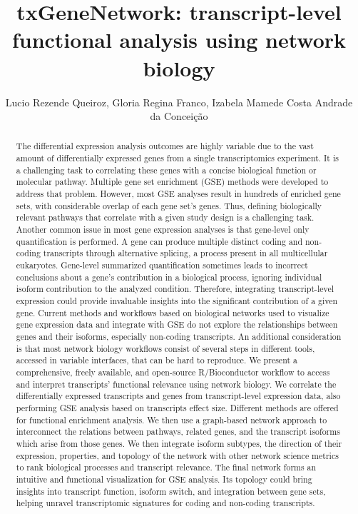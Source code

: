 \documentclass[twoside]{article}
\title{\vspace{-15mm}\fontsize{24pt}{10pt}\selectfont\textbf{ txGeneNetwork: transcript-level functional analysis using network biology }} %
\author{ Lucio Rezende Queiroz,  Gloria Regina Franco,  Izabela Mamede Costa Andrade da Concei\c{c}\~ao }
\affil{ UFMG - Departamento de Bioqu\'{\i}mica e Imunologia,  UFMG,  UNIVERSIDADE FEDERAL DE MINAS GERAIS }
\date{}
\begin{document}
  
  
  \maketitle %
  
  
  \thispagestyle{fancy} %
  
  
  \begin{abstract}
  The differential expression analysis outcomes are highly variable due to the vast amount of differentially expressed genes from a single transcriptomics experiment. It is a challenging task to correlating these genes with a concise biological function or molecular pathway. Multiple gene set enrichment (GSE) methods were developed to address that problem. However,  most GSE analyses result in hundreds of enriched gene sets,  with considerable overlap of each gene set’s genes. Thus,  defining biologically relevant pathways that correlate with a given study design is a challenging task.
Another common issue in most gene expression analyses is that gene-level only quantification is performed. A gene can produce multiple distinct coding and non-coding transcripts through alternative splicing,  a process present in all multicellular eukaryotes. Gene-level summarized quantification sometimes leads to incorrect conclusions about a gene’s contribution in a biological process,  ignoring individual isoform contribution to the analyzed condition. Therefore,  integrating transcript-level expression could provide invaluable insights into the significant contribution of a given gene.
Current methods and workflows based on biological networks used to visualize gene expression data and integrate with GSE do not explore the relationships between genes and their isoforms,  especially non-coding transcripts. An additional consideration is that most network biology workflows consist of several steps in different tools,  accessed in variable interfaces,  that can be hard to reproduce. We present a comprehensive,  freely available,  and open-source R/Bioconductor workflow to access and interpret transcripts’ functional relevance using network biology.
We correlate the differentially expressed transcripts and genes from transcript-level expression data,  also performing GSE analysis based on transcripts effect size. Different methods are offered for functional enrichment analysis. We then use a graph-based network approach to interconnect the relations between pathways,  related genes,  and the transcript isoforms which arise from those genes. We then integrate isoform subtypes,  the direction of their expression,  properties,  and topology of the network with other network science metrics to rank biological processes and transcript relevance.
The final network forms an intuitive and functional visualization for GSE analysis. Its topology could bring insights into transcript function,  isoform switch,  and integration between gene sets,  helping unravel transcriptomic signatures for coding and non-coding transcripts.
  

\end{abstract}
\end{document}
